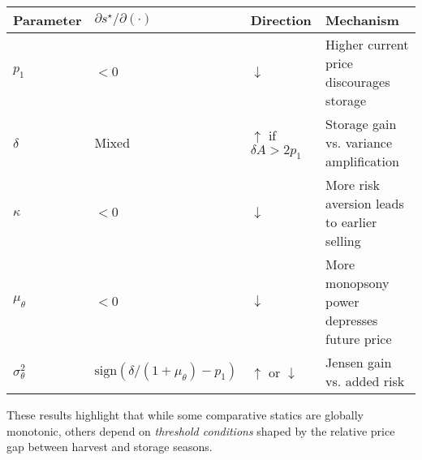 \begin{table}[H]
\centering
\begin{tabular}{llll}
\toprule
\textbf{Parameter} & \(\partial s^{\star}/\partial(\cdot)\) & \textbf{Direction} & \textbf{Mechanism} \\
\midrule
\(p_1\) & \(< 0\) & \(\downarrow\) & Higher current price discourages storage \\
\(\delta\) & Mixed & \(\uparrow\) if \(\delta A > 2p_1\) & Storage gain vs. variance amplification \\
\(\kappa\) & \(< 0\) & \(\downarrow\) & More risk aversion leads to earlier selling \\
\(\mu_\theta\) & \(< 0\) & \(\downarrow\) & More monopsony power depresses future price \\
\(\sigma_\theta^2\) & \(\text{sign}(\delta/(1+\mu_\theta) - p_1)\) & \(\uparrow\) or \(\downarrow\) & Jensen gain vs. added risk \\
\bottomrule
\end{tabular}
\end{table}

These results highlight that while some comparative statics are globally monotonic, others depend on \textit{threshold conditions} shaped by the relative price gap between harvest and storage seasons.
